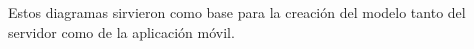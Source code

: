Estos diagramas sirvieron como base para la creación del modelo tanto del servidor como de la aplicación móvil. 
%
%
%
%
%
